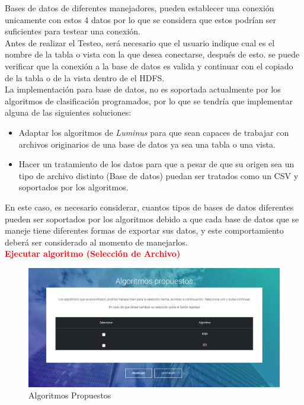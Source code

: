Bases de datos de diferentes manejadores, pueden establecer una conexión unicamente con estos 4 datos por lo que se considera que estos podrían ser suficientes para testear una conexión.\\ 
Antes de realizar el Testeo, será necesario que el usuario indique cual es el nombre de la tabla o vista con la que desea conectarse, después de esto. se puede verificar que la conexión a la base de datos es valida y continuar con el copiado de la tabla o de la vista dentro de el HDFS.\\
La implementación para base de datos, no es soportada actualmente por los algoritmos de clasificación programados, por lo que se tendría que implementar alguna de las siguientes soluciones:\\
\begin{itemize}
	\item Adaptar los algoritmos de \emph{Luminus} para que sean capaces de trabajar con archivos originarios de una base de datos ya sea una tabla o una vista.
	\item Hacer un tratamiento de los datos para que a pesar de que su origen sea un tipo de archivo distinto (Base de datos) puedan ser tratados como un CSV y soportados por los algoritmos. 
\end{itemize}  
En este caso, es necesario considerar, cuantos tipos de bases de datos diferentes pueden ser soportados por los algoritmos debido a que cada base de datos que se maneje tiene diferentes formas de exportar sus datos, y este comportamiento deberá ser considerado al momento de manejarlos.\\
\textbf{\textcolor{red}{Ejecutar algoritmo (Selección de Archivo)}}
\begin{figure}[H]
	\hypertarget{fig:red}{\hspace{1pt}}
	\begin{center}
		\includegraphics[width=.9\textwidth]{capitulo7/images/algoritmospro.png}
		\caption{Algoritmos Propuestos}
		\label{fig:algo}
	\end{center}
\end{figure}
